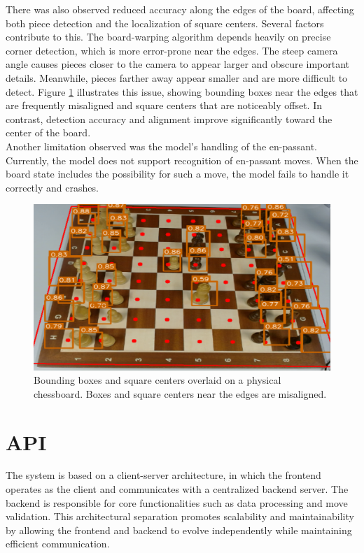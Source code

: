 There was also observed reduced accuracy along the edges of the board, affecting both piece detection and the localization of square centers. Several factors contribute to this. The board-warping algorithm depends heavily on precise corner detection, which is more error-prone near the edges. The steep camera angle causes pieces closer to the camera to appear larger and obscure important details. Meanwhile, pieces farther away appear smaller and are more difficult to detect. Figure \ref{fig:bbox-centers-incorrect} illustrates this issue, showing bounding boxes near the edges that are frequently misaligned and square centers that are noticeably offset. In contrast, detection accuracy and alignment improve significantly toward the center of the board. \\

Another limitation observed was the model's handling of the \gls{en-passant}. Currently, the model does not support recognition of \gls{en-passant} moves. When the board state includes the possibility for such a move, the model fails to handle it correctly and crashes.


\begin{figure}[h!]
    \centering
    \includegraphics[width=0.75\linewidth]{figures/discussion/bbox-centers-incorrect.png}
    \caption[Bounding box and square center misalignment]{Bounding boxes and square centers overlaid on a physical chessboard. Boxes and square centers near the edges are misaligned.}
    \label{fig:bbox-centers-incorrect}
\end{figure}


\section{API}
The system is based on a client-server architecture, in which the frontend operates as the client and communicates with a centralized backend server. The backend is responsible for core functionalities such as data processing and move validation. This architectural separation promotes scalability and maintainability by allowing the frontend and backend to evolve independently while maintaining efficient communication. \\

